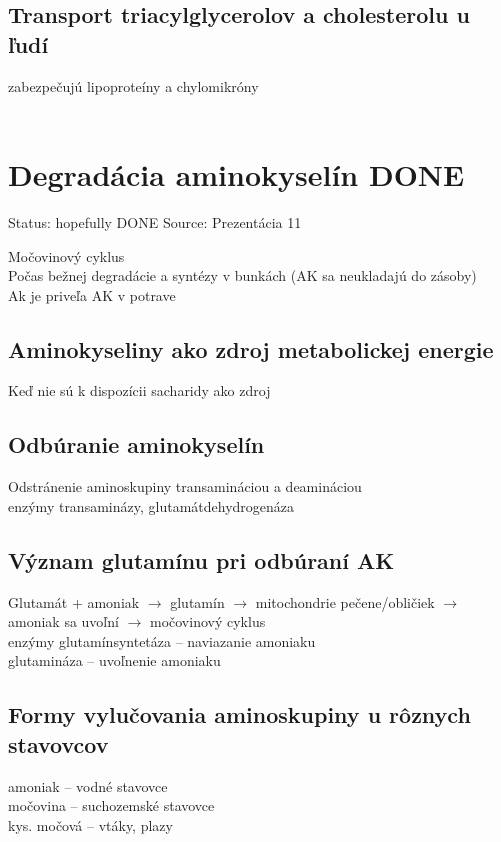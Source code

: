 \subsection*{Transport triacylglycerolov a cholesterolu u ľudí}
zabezpečujú lipoproteíny a chylomikróny\\
\\

\section{Degradácia aminokyselín DONE}

Status: hopefully DONE
Source: Prezentácia 11

Močovinový cyklus\\
Počas bežnej degradácie a syntézy v bunkách (AK sa neukladajú do zásoby)\\
Ak je priveľa AK v potrave\\
\subsection*{Aminokyseliny ako zdroj metabolickej energie}
Keď nie sú k dispozícii sacharidy ako zdroj\\
\subsection*{Odbúranie aminokyselín}
Odstránenie aminoskupiny transamináciou a deamináciou\\
enzýmy transaminázy, glutamátdehydrogenáza\\
\subsection*{Význam glutamínu pri odbúraní AK}
Glutamát + amoniak $\rightarrow$ glutamín $\rightarrow$ mitochondrie pečene/obličiek $\rightarrow$ amoniak sa uvoľní $\rightarrow$ močovinový cyklus\\
enzýmy glutamínsyntetáza -- naviazanie amoniaku\\
glutamináza -- uvoľnenie amoniaku\\
\subsection*{Formy vylučovania aminoskupiny u rôznych stavovcov}
amoniak -- vodné stavovce\\
močovina -- suchozemské stavovce\\
kys. močová -- vtáky, plazy\\
